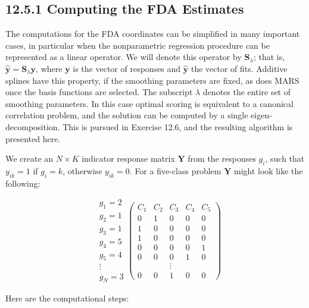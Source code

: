 \documentclass[10pt]{article}
\begin{document}
\subsection*{12.5.1 Computing the FDA Estimates}
The computations for the FDA coordinates can be simplified in many important cases, in particular when the nonparametric regression procedure can be represented as a linear operator. We will denote this operator by $\mathbf{S}_{\lambda}$; that is, $\hat{\mathbf{y}}=\mathbf{S}_{\lambda} \mathbf{y}$, where $\mathbf{y}$ is the vector of responses and $\hat{\mathbf{y}}$ the vector of fits. Additive splines have this property, if the smoothing parameters are fixed, as does MARS once the basis functions are selected. The subscript $\lambda$ denotes the entire set of smoothing parameters. In this case optimal scoring is equivalent to a canonical correlation problem, and the solution can be computed by a single eigen-decomposition. This is pursued in Exercise 12.6, and the resulting algorithm is presented here.

We create an $N \times K$ indicator response matrix $\mathbf{Y}$ from the responses $g_{i}$, such that $y_{i k}=1$ if $g_{i}=k$, otherwise $y_{i k}=0$. For a five-class problem $\mathbf{Y}$ might look like the following:

$$
\begin{aligned}
& g_{1}=2 \\
& g_{2}=1 \\
& g_{3}=1 \\
& g_{4}=5 \\
& g_{5}=4 \\
& \vdots \\
& g_{N}=3
\end{aligned}\left(\begin{array}{ccccc}
C_{1} & C_{2} & C_{3} & C_{4} & C_{5} \\
0 & 1 & 0 & 0 & 0 \\
1 & 0 & 0 & 0 & 0 \\
1 & 0 & 0 & 0 & 0 \\
0 & 0 & 0 & 0 & 1 \\
0 & 0 & 0 & 1 & 0 \\
& & \vdots & & \\
0 & 0 & 1 & 0 & 0
\end{array}\right)
$$

Here are the computational steps:
\end{document}
